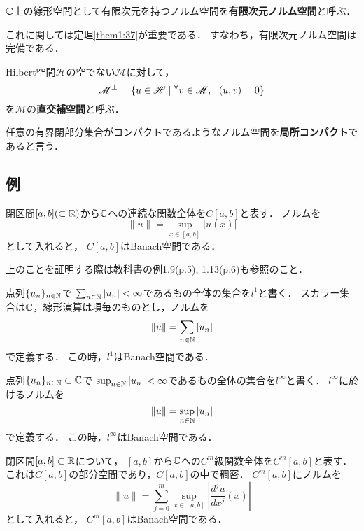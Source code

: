         \begin{Def}
            $\mathbb{C}$上の線形空間として有限次元を持つノルム空間を\textbf{有限次元ノルム空間}と呼ぶ．
        \end{Def}
        これに関しては定理\ref{them1:37}が重要である．
        すなわち，有限次元ノルム空間は完備である．

        \begin{Def}
            Hilbert空間$\mathscr{H}$の空でない$\mathscr{M}$に対して，
            \[ \mathscr{M}^{\perp}=\{ u \in \mathscr{H} \mid {}^{\forall} v \in \mathscr{M},~~ (u,v)=0\} \]
            を$\mathscr{M}$の\textbf{直交補空間}と呼ぶ．
        \end{Def}

        \begin{Def}
            任意の有界閉部分集合がコンパクトであるようなノルム空間を\textbf{局所コンパクト}であると言う．
        \end{Def}

    \subsection{例}
        \begin{Example}[例1.17, p.8]
            閉区間$[a,b]( \subset \mathbb{R})$から$\mathbb{C}$への連続な関数全体を$C[a,b]$と表す．
            ノルムを\[ \|u\|=\displaystyle{\sup_{x \in [a,b]}{|u(x)|}} \]として入れると，
            $C[a,b]$はBanach空間である．
        \end{Example}
        上のことを証明する際は教科書の例1.9(p.5), 1.13(p.6)も参照のこと．

        \begin{Example}[例1.18, p.9]
            点列$\{u_n\}_{n \in \mathbb{N}}$で
            $\sum_{n \in \mathbb{N}}{|u_n|}<\infty$であるもの全体の集合を$l^1$と書く．
            スカラー集合は$\mathbb{C}$，線形演算は項毎のものとし，ノルムを\[ \|u\|=\sum_{n \in \mathbb{N}}{|u_n|} \]で定義する．
            この時，$l^1$はBanach空間である．
        \end{Example}
        \begin{Example}[例1.19, p.10]
            点列$\{u_n\}_{n \in \mathbb{N}} \subset \mathbb{C}$で
            $\sup_{n \in \mathbb{N}}{|u_n|}<\infty$であるもの全体の集合を$l^{\infty}$と書く．
            $l^{\infty}$に於けるノルムを\[ \|u\|=\sup_{n \in \mathbb{N}}{|u_n|} \]で定義する．
            この時，$l^{\infty}$はBanach空間である．
        \end{Example}
        \begin{Example}[例1.33, p.19]
            閉区間$[a,b] \subset \mathbb{R}$について，
            $[a,b]$から$\mathbb{C}$への$C^m$級関数全体を$C^m[a,b]$と表す．
            これは$C[a,b]$の部分空間であり，$C[a,b]$の中で稠密．
            $C^m[a,b]$にノルムを
            \[ \|u\|=\sum_{j=0}^{m}{ \sup_{x \in [a,b]}{\left| \frac{d^j u}{dx^j}(x) \right|} } \]
            として入れると，
            $C^m[a,b]$はBanach空間である．
        \end{Example}

